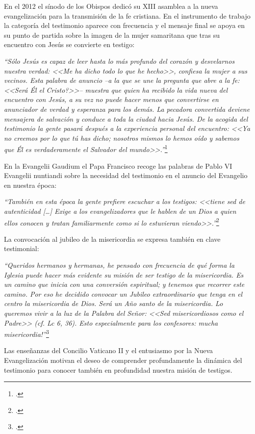 \documentclass[11pt]{article}
\begin{document}
En el 2012 el sínodo de los Obispos dedicó su XIII asamblea a la nueva evangelización para la transmisión de la fe cristiana. En el instrumento de trabajo la categoría del testimonio aparece con frecuencia y el mensaje final se apoya en su punto de partida sobre la imagen de la mujer samaritana que tras su encuentro con Jesús se convierte en testigo:

\emph{``Sólo Jesús es capaz de leer hasta lo más profundo del corazón y desvelarnos nuestra verdad: <<Me ha dicho todo lo que he hecho>>, confiesa la mujer a sus vecinos. Esta palabra de anuncio --a la que se une la pregunta que abre a la fe: <<\textquestiondown{}Será Él el Cristo?>>-- muestra que quien ha recibido la vida nueva del encuentro con Jesús, a su vez no puede hacer menos que convertirse en anunciador de verdad y esperanza para los demás. La pecadora convertida deviene mensajera de salvación y conduce a toda la ciudad hacia Jesús. De la acogida del testimonio la gente pasará después a la experiencia personal del encuentro: <<Ya no creemos por lo que tú has dicho; nosotros mismos lo hemos oído y sabemos que Él es verdaderamente el Salvador del mundo>>.''}\footcite{sinod}

En la Evangelii Gaudium el Papa Francisco recoge las palabras de Pablo VI Evangelii nuntiandi sobre la necesidad del testimonio en el anuncio del Evangelio en nuestra época:

\emph{``También en esta época la gente prefiere escuchar a los testigos: <<tiene sed de autenticidad [\ldots] Exige a los
evangelizadores que le hablen de un Dios a quien ellos conocen y tratan familiarmente como si lo
estuvieran viendo>>.''}\footcite[n. 150]{EG}

La convocación al jubileo de la misericordia se expresa también en clave testimonial:

\emph{``Queridos hermanos y hermanas, he pensado con frecuencia de qué forma la Iglesia puede hacer más evidente su misión de ser testigo de la misericordia. Es un camino que inicia con una conversión espiritual; y tenemos que recorrer este camino. Por eso he decidido convocar un Jubileo extraordinario que tenga en el centro la misericordia de Dios. Será un Año santo de la misericordia. Lo queremos vivir a la luz de la Palabra del Señor: <<Sed misericordiosos como el Padre>> (cf. Lc 6, 36). Esto especialmente para los confesores: \textexclamdown{}mucha misericordia!''}\footcite{fran_mis}

Las enseñanzas del Concilio Vaticano II y el entusiasmo por la Nueva Evangelización motivan el deseo de comprender profundamente la dinámica del testimonio para conocer también en profundidad nuestra misión de testigos. 
\end{document}
